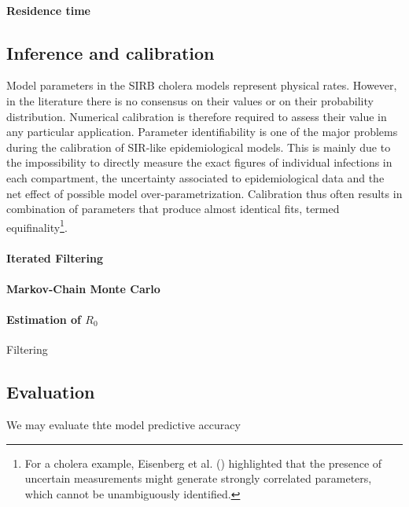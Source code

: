 \paragraph{Residence time}

\cite{Hurtado:GeneralizationsLinearChain:2019}


\subsection{Inference and calibration} 
Model parameters in the SIRB cholera models represent physical rates. However, in the literature there is no consensus on their values or on their  probability distribution. Numerical calibration is therefore required to assess their value in any particular application. Parameter identifiability is one of the major problems during the calibration of SIR-like epidemiological models. This is mainly due to the impossibility to directly measure the exact figures of individual infections in each compartment, the uncertainty associated to epidemiological data and the net effect of possible model over-parametrization. Calibration thus often results in combination of parameters that produce almost identical fits, termed equifinality\footnote{For a cholera example, Eisenberg et al. () highlighted that the presence of uncertain measurements might generate strongly correlated parameters, which cannot be unambiguously identified.}.

\paragraph{Iterated Filtering}




\paragraph{Markov-Chain Monte Carlo}



\paragraph{Estimation of $R_0$} 

 Filtering
\subsection{Evaluation}
We may evaluate thte model predictive accuracy

